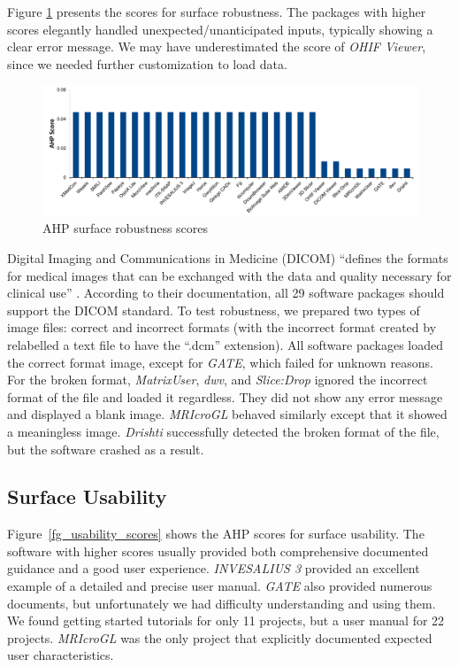 \documentclass[11pt]{article}
\begin{document}
Figure \ref{fg_robustness_scores} presents the scores for surface robustness.
The packages with higher scores elegantly handled unexpected/unanticipated
inputs, typically showing a clear error message. We may have underestimated the
score of \textit{OHIF Viewer}, since we needed further customization to load
data.

\begin{figure}[!ht]
\includegraphics[scale=0.47]{robustness_scores.pdf}
\caption{AHP surface robustness scores}
\label{fg_robustness_scores}
\end{figure}

Digital Imaging and Communications in Medicine (DICOM) ``defines the formats for
medical images that can be exchanged with the data and quality necessary for
clinical use'' \citep{MITA2021}. According to their documentation, all 29
software packages should support the DICOM standard. To test robustness, we
prepared two types of image files: correct and incorrect formats (with the
incorrect format created by relabelled a text file to have the ``.dcm''
extension).  All software packages loaded the correct format image, except for
\textit{GATE}, which failed for unknown reasons.  For the broken format,
\textit{MatrixUser}, \textit{dwv}, and \textit{Slice:Drop} ignored the incorrect
format of the file and loaded it regardless. They did not show any error message
and displayed a blank image. \textit{MRIcroGL} behaved similarly except that it
showed a meaningless image. \textit{Drishti} successfully detected the broken
format of the file, but the software crashed as a result.

\subsection{Surface Usability} \label{sec_result_usability}

Figure~\ref{fg_usability_scores} shows the AHP scores for surface usability. The
software with higher scores usually provided both comprehensive documented
guidance and a good user experience. \textit{INVESALIUS 3} provided an excellent
example of a detailed and precise user manual. \textit{GATE} also provided
numerous documents, but unfortunately we had difficulty understanding and using
them. We found getting started tutorials for only 11 projects, but a user manual
for 22 projects. \textit{MRIcroGL} was the only project that explicitly
documented expected user characteristics.
\end{document}
